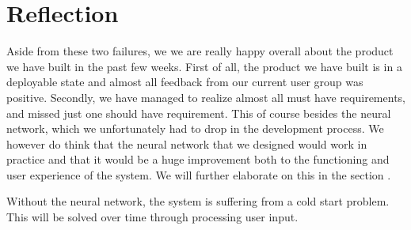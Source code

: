 \section{Reflection}
Aside from these two failures, we we are really happy overall about the product we have built in the past few weeks.
First of all, the product we have built is in a deployable state and almost all feedback from our current user group was positive.
Secondly, we have managed to realize almost all must have requirements, and missed just one should have requirement.
This of course besides the neural network, which we unfortunately had to drop in the development process.
We however do think that the neural network that we designed would work in practice and that it would be a huge improvement both to the functioning and user experience of the system.
We will further elaborate on this in the section .

Without the neural network, the system is suffering from a cold start problem.
This will be solved over time through processing user input.
